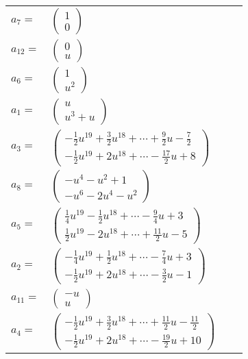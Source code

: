 \documentclass[1p]{elsarticle_modified}
\theoremstyle{definition}
\begin{document}
\begin{tabular}{m{7pt} m{180pt} m{7pt} m{180pt} }
\flushright $a_{7}=$&$\begin{pmatrix}1\\0\end{pmatrix}$ \\
\flushright $a_{12}=$&$\begin{pmatrix}0\\u\end{pmatrix}$ \\
\flushright $a_{6}=$&$\begin{pmatrix}1\\u^2\end{pmatrix}$ \\
\flushright $a_{1}=$&$\begin{pmatrix}u\\u^3+u\end{pmatrix}$ \\
\flushright $a_{3}=$&$\begin{pmatrix}-\frac{1}{2} u^{19}+\frac{3}{2} u^{18}+\cdots+\frac{9}{2} u-\frac{7}{2}\\-\frac{1}{2} u^{19}+2 u^{18}+\cdots-\frac{17}{2} u+8\end{pmatrix}$ \\
\flushright $a_{8}=$&$\begin{pmatrix}- u^4- u^2+1\\- u^6-2 u^4- u^2\end{pmatrix}$ \\
\flushright $a_{5}=$&$\begin{pmatrix}\frac{1}{4} u^{19}-\frac{1}{2} u^{18}+\cdots-\frac{9}{4} u+3\\\frac{1}{2} u^{19}-2 u^{18}+\cdots+\frac{11}{2} u-5\end{pmatrix}$ \\
\flushright $a_{2}=$&$\begin{pmatrix}-\frac{1}{4} u^{19}+\frac{1}{2} u^{18}+\cdots-\frac{7}{4} u+3\\-\frac{1}{2} u^{19}+2 u^{18}+\cdots-\frac{3}{2} u-1\end{pmatrix}$ \\
\flushright $a_{11}=$&$\begin{pmatrix}- u\\u\end{pmatrix}$ \\
\flushright $a_{4}=$&$\begin{pmatrix}-\frac{1}{2} u^{19}+\frac{3}{2} u^{18}+\cdots+\frac{11}{2} u-\frac{11}{2}\\-\frac{1}{2} u^{19}+2 u^{18}+\cdots-\frac{19}{2} u+10\end{pmatrix}$ \\

\end{tabular}
\end{document}
